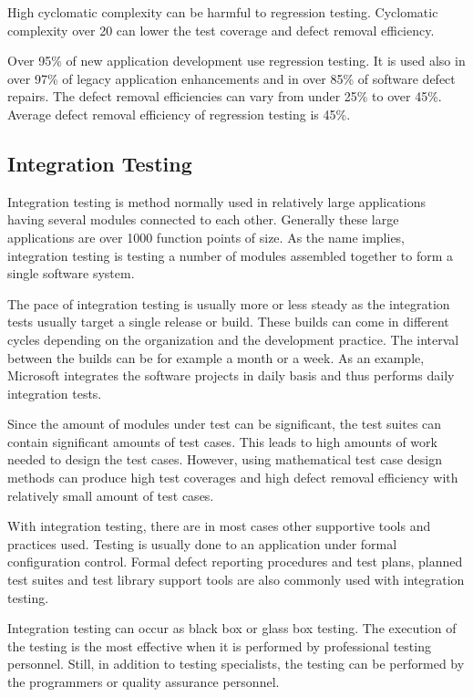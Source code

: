 High cyclomatic complexity can be harmful to regression testing. Cyclomatic complexity over 20 can lower the test coverage and defect removal efficiency.

Over 95\% of new application development use regression testing. It is used also in over 97\% of legacy application enhancements and in over 85\% of software defect repairs. The defect removal efficiencies can vary from under 25\% to over 45\%. Average defect removal efficiency of regression testing is 45\%.



 \subsection{Integration Testing}

Integration testing is method normally used in relatively large applications having several modules connected to each other. Generally these large applications are over 1000 function points of size. As the name implies, integration testing is testing a number of modules assembled together to form a single software system.

The pace of integration testing is usually more or less steady as the integration tests usually target a single release or build. These builds can come in different cycles depending on the organization and the development practice. The interval between the builds can be for example a month or a week. As an example, Microsoft integrates the software projects in daily basis and thus performs daily integration tests.

Since the amount of modules under test can be significant, the test suites can contain significant amounts of test cases. This leads to high amounts of work needed to design the test cases. However, using mathematical test case design methods can produce high test coverages and high defect removal efficiency with relatively small amount of test cases. 

With integration testing, there are in most cases other supportive tools and practices used. Testing is usually done to an application under formal configuration control. Formal defect reporting procedures and test plans, planned test suites and test library support tools are also commonly used with integration testing.

Integration testing can occur as black box or glass box testing. The execution of the testing is the most effective when it is performed by professional testing personnel. Still, in addition to testing specialists, the testing can be performed by the programmers or quality assurance personnel. 

